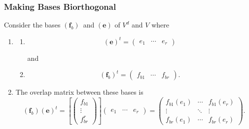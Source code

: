 \documentclass[aps,preprint]{revtex4}
\begin{document}
\subsubsection{Making Bases Biorthogonal}

Consider the bases $\left( \boldsymbol{f}_{b}\right) \,$ and $\left( 
\boldsymbol{e}\right) $ of $V^{d}$ and $V$ where

\begin{enumerate}
\item 
\begin{enumerate}
\item 
\begin{equation}
\left( \boldsymbol{e}\right) ^{t}=\left( 
\begin{array}{ccc}
e_{1} & \cdots & e_{r}%
\end{array}%
\right)
\end{equation}

and

\item 
\begin{equation}
\left( \boldsymbol{f}_{b}\right) ^{t}=\left( 
\begin{array}{ccc}
f_{b1} & \cdots & f_{br}%
\end{array}%
\right) .
\end{equation}
\end{enumerate}

\item The overlap matrix between these bases is 
\begin{equation}
\left( \boldsymbol{f}_{b}\right) \left( \boldsymbol{e}\right) ^{t}=\left[
\left( 
\begin{array}{c}
f_{b1} \\ 
\vdots \\ 
f_{br}^{r}%
\end{array}%
\right) \right] \left( 
\begin{array}{ccc}
e_{1} & \cdots & e_{r}%
\end{array}%
\right) =\left( 
\begin{array}{ccc}
f_{b1}\left( e_{1}\right) & \cdots & f_{b1}\left( e_{r}\right) \\ 
\vdots & \ddots & \vdots \\ 
f_{br}\left( e_{1}\right) & \cdots & f_{br}\left( e_{r}\right)%
\end{array}%
\right) .
\end{equation}


\end{enumerate}
\end{document}
